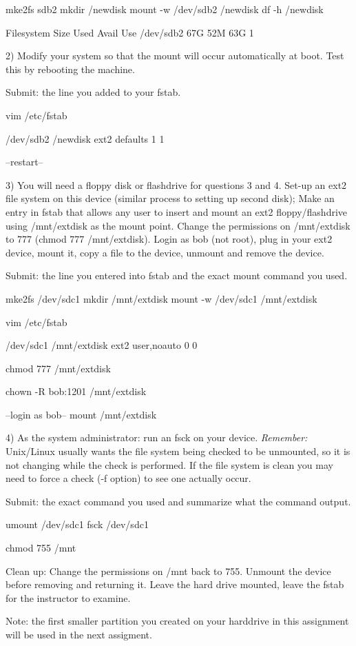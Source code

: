 mke2fs sdb2
mkdir /newdisk
mount -w /dev/sdb2 /newdisk
df -h /newdisk

Filesystem	Size	Used	Avail	Use%
/dev/sdb2	67G	52M	63G	1%

2) Modify your system so that the mount will 
occur automatically at boot.
Test this by rebooting the machine.

Submit: the line you added to your {\ltt{}fstab}.

vim /etc/fstab

/dev/sdb2	/newdisk	ext2	defaults	1	1

--restart--

3) You will need a floppy disk or flashdrive for questions 3 and 4. Set-up 
an ext2 file system on this device (similar process to setting up second disk);
Make an entry in {\ltt{}fstab} that allows any user to insert and 
mount an ext2 floppy/flashdrive using {\ltt{}/mnt/extdisk} as the mount point.
Change the permissions on {\ltt{}/mnt/extdisk} to 777 
({\ltt{}chmod 777 /mnt/extdisk}).
Login as bob (not root), plug in your ext2 device, 
mount it, copy a file to the device, unmount and remove the device.

Submit: the line you entered into {\ltt{}fstab} and
the exact mount command you used.

mke2fs /dev/sdc1
mkdir /mnt/extdisk
mount -w /dev/sdc1 /mnt/extdisk

vim /etc/fstab

/dev/sdc1	/mnt/extdisk	ext2	user,noauto	0	0

chmod 777 /mnt/extdisk

chown -R bob:1201 /mnt/extdisk

--login as bob--
mount /mnt/extdisk

4) As the system administrator: run an {\ltt{}fsck} on your device. 
{\it Remember:} Unix/Linux usually wants the file system being checked to 
be unmounted, so it is not changing while the check is performed. 
If the file system is clean you may need to force a check ({\ltt{}-f} option)
 to see one actually occur.

Submit: the exact command you used and summarize what the command output.

umount /dev/sdc1
fsck /dev/sdc1

chmod 755 /mnt

Clean up: Change the permissions on {\ltt{}/mnt} back to 755.
Unmount the device before removing and returning it.
Leave the hard drive mounted, leave the fstab for the instructor to examine.

Note: the first smaller partition you created on your harddrive
in this assignment will be used in the next assigment.
\bye
